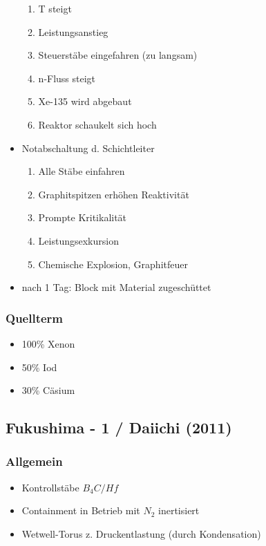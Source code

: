 \documentclass[12pt]{article}
\begin{document}
\begin{itemize}[noitemsep]
		\begin{enumerate}[label = \textrightarrow]
			\item T steigt
			\item Leistungsanstieg
			\item Steuerstäbe eingefahren (zu langsam)
			\item n-Fluss steigt
			\item Xe-135 wird abgebaut
			\item Reaktor schaukelt sich hoch
		\end{enumerate}
	\item Notabschaltung d. Schichtleiter
		\begin{enumerate}[label = \textrightarrow]
			\item Alle Stäbe einfahren
			\item Graphitspitzen erhöhen Reaktivität
			\item Prompte Kritikalität
			\item Leistungsexkursion
			\item Chemische Explosion, Graphitfeuer
		\end{enumerate}
	\item nach 1 Tag: Block mit Material zugeschüttet

\end{itemize}

\subsubsection{Quellterm}
\begin{itemize}[noitemsep]
	\item 100\% Xenon
	\item 50\% Iod
	\item 30\% Cäsium
\end{itemize}

\subsection{Fukushima - 1 / Daiichi (2011)}

\subsubsection{Allgemein}
\begin{itemize}[noitemsep]
	\item Kontrollstäbe \(B_4C/Hf\)
	\item Containment in Betrieb mit \(N_2\) inertisiert
	\item Wetwell-Torus z. Druckentlastung (durch Kondensation)
\end{itemize}
\end{document}
